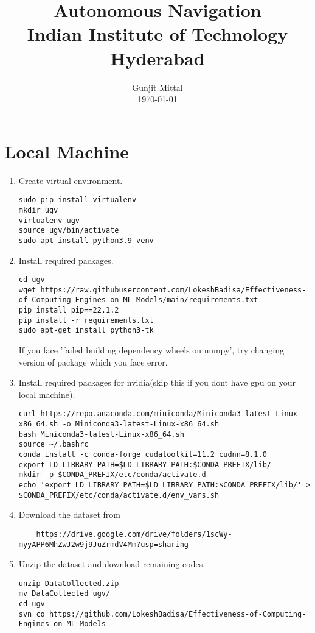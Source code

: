\documentclass[journal,12pt,twocolumn]{IEEEtran}
\numberwithin{equation}{section}
\renewcommand\thesection{\arabic{section}}
\begin{document}
                             
\title{ Autonomous Navigation \\ \large Indian Institute of  Technology Hyderabad}
\author{Gunjit Mittal \\ \vspace*{20pt} \normalsize \today}    
 \maketitle 
 \tableofcontents
\section{Local Machine}
\begin{enumerate}[label=\thesection.\arabic*.,ref=\thesection.\theenumi]
\item Create virtual environment.
\begin{lstlisting}
sudo pip install virtualenv 
mkdir ugv
virtualenv ugv
source ugv/bin/activate
sudo apt install python3.9-venv
\end{lstlisting}
\item Install required packages.
\begin{lstlisting}
cd ugv
wget https://raw.githubusercontent.com/LokeshBadisa/Effectiveness-of-Computing-Engines-on-ML-Models/main/requirements.txt
pip install pip==22.1.2
pip install -r requirements.txt
sudo apt-get install python3-tk
\end{lstlisting}
If you face 'failed building dependency wheels on numpy', try changing version of package which you face error.
\item Install required packages for nvidia(skip this if you dont have gpu on your local machine).
\begin{lstlisting}
curl https://repo.anaconda.com/miniconda/Miniconda3-latest-Linux-x86_64.sh -o Miniconda3-latest-Linux-x86_64.sh
bash Miniconda3-latest-Linux-x86_64.sh
source ~/.bashrc
conda install -c conda-forge cudatoolkit=11.2 cudnn=8.1.0
export LD_LIBRARY_PATH=$LD_LIBRARY_PATH:$CONDA_PREFIX/lib/
mkdir -p $CONDA_PREFIX/etc/conda/activate.d
echo 'export LD_LIBRARY_PATH=$LD_LIBRARY_PATH:$CONDA_PREFIX/lib/' > $CONDA_PREFIX/etc/conda/activate.d/env_vars.sh
\end{lstlisting}
\item Download  the dataset from 
\begin{lstlisting}
	https://drive.google.com/drive/folders/1scWy-myyAPP6MhZwJ2w9j9JuZrmdV4Mm?usp=sharing
\end{lstlisting}
\item Unzip the dataset and download remaining codes.

\begin{lstlisting}
unzip DataCollected.zip
mv DataCollected ugv/
cd ugv
svn co https://github.com/LokeshBadisa/Effectiveness-of-Computing-Engines-on-ML-Models
\end{lstlisting}
\end{enumerate}
\end{document}
